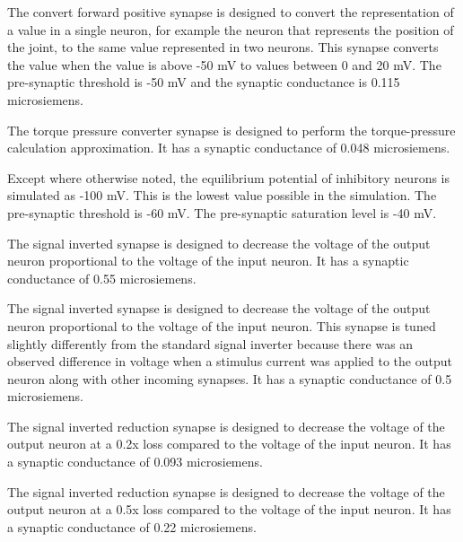 
The convert forward positive synapse is designed to convert the representation
of a value in a single neuron, for example the neuron that represents the 
position of the joint, to the same value represented in two neurons. This
synapse converts the value when the value is above -50 mV to values between 0 
and 20 mV. The pre-synaptic
threshold is -50 mV and the synaptic conductance is 0.115 microsiemens.


The torque pressure converter synapse is designed to perform the torque-pressure
calculation approximation. It has a synaptic 
conductance of 0.048 microsiemens.


Except where otherwise noted, the equilibrium potential of inhibitory neurons
is simulated as -100 mV. This is the lowest value possible in the simulation.
The pre-synaptic threshold is -60 mV. The pre-synaptic saturation level is -40
mV.


The signal inverted synapse is designed to decrease the voltage of the output 
neuron proportional to the voltage of the input neuron. It has a synaptic 
conductance of 0.55 microsiemens.


The signal inverted synapse is designed to decrease the voltage of the output 
neuron proportional to the voltage of the input neuron. This synapse is tuned
slightly differently from the standard signal inverter because there was an
observed difference in voltage when a stimulus current was applied to the output
neuron along with other incoming synapses. It has a synaptic 
conductance of 0.5 microsiemens.


The signal inverted reduction synapse is designed to decrease the voltage of
the output 
neuron at a 0.2x loss compared to the voltage of the input neuron. It has a 
synaptic conductance of 0.093 microsiemens.


The signal inverted reduction synapse is designed to decrease the voltage of
the output 
neuron at a 0.5x loss compared to the voltage of the input neuron. It has a 
synaptic conductance of 0.22 microsiemens.

